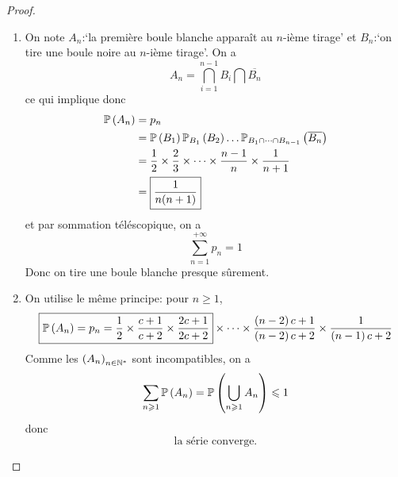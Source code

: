 \begin{proof}
    \phantom{}
    \begin{enumerate}
        \item On note $A_{n}$:`la première boule blanche apparaît au $n$-ième tirage' et $B_{n}$:`on tire une boule noire au $n$-ième tirage'. On a 
        \begin{equation}
            A_{n}=\bigcap_{i=1}^{n-1}B_{i}\bigcap\overline{B_{n}}
        \end{equation}
        ce qui implique donc 
        \begin{align}
            \P\left(A_{n}\right)
            &=p_{n}\\
            &=\P\left(B_{1}\right)\P_{B_{1}}\left(B_{2}\right)\dots\P_{B_{1}\cap \dots \cap B_{n-1}}\left(\overline{B_{n}}\right)\\
            &=\frac{1}{2}\times\frac{2}{3}\times\dots\times\frac{n-1}{n}\times\frac{1}{n+1}\\
            &=\boxed{\frac{1}{n(n+1)}}
        \end{align}
        et par sommation téléscopique, on a 
        \begin{equation}
            \boxed{\sum_{n=1}^{+\infty}p_{n}=1}
        \end{equation}
        Donc on tire une boule blanche presque sûrement.

        \item On utilise le même principe: pour $n\geqslant1$,
        \begin{equation}
            \boxed{\P\left(A_{n}\right)=p_{n}=\frac{1}{2}\times\frac{c+1}{c+2}\times\frac{2c+1}{2c+2}}\times\dots\times\frac{\left(n-2\right)c+1}{\left(n-2\right)c+2}\times\frac{1}{\left(n-1\right)c+2}
        \end{equation}
        Comme les $\left(A_{n}\right)_{n\in\N^{*}}$ sont incompatibles, on a 
        \begin{equation}
            \sum_{n\geqslant1}\P\left(A_{n}\right)=\P\left(\bigcup_{n\geqslant1} A_{n}\right)\leqslant1
        \end{equation}
        donc 
        \begin{equation}
            \boxed{\text{la série converge.}}
        \end{equation}


\end{enumerate}
\end{proof}
